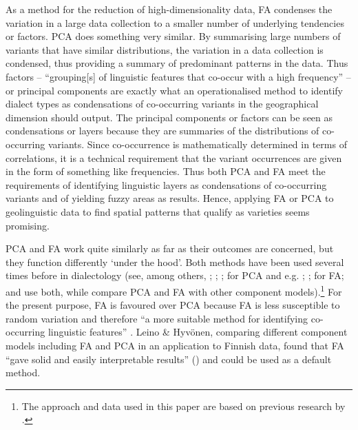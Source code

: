 \documentclass[output=paper]{LSP/langsci}
\begin{document}
As a method for the reduction of high-dimensionality data, FA condenses the variation in a large data collection to a smaller number of underlying tendencies or factors. PCA does something very similar. By summarising large numbers of variants that have similar distributions, the variation in a data collection is condensed, thus providing a summary of predominant patterns in the data. Thus factors – “grouping[s] of linguistic features that co-occur with a high frequency” – or principal components are exactly what an operationalised method to identify dialect types as condensations of co-occurring variants in the geographical dimension should output. The principal components or factors can be seen as condensations or layers because they are summaries of the distributions of co-occurring variants. Since co-occurrence is mathematically determined in terms of correlations, it is a technical requirement that the variant occurrences are given in the form of something like frequencies. Thus both PCA and FA meet the requirements of identifying linguistic layers as condensations of co-occurring variants and of yielding fuzzy areas as results. Hence, applying FA or PCA to geolinguistic data to find spatial patterns that qualify as varieties seems promising.

PCA and FA work quite similarly as far as their outcomes are concerned, but they function differently ‘under the hood’. Both methods have been used several times before in dialectology (see, among others, \citealt{shackleton_english-american_2005}; \citealt{hyvonen_multivariate_2007}; \citealt{szmrecsanyi_holistic_2011}; \citealt{wieling_analyzing_2013} for PCA and e.g. \citealt{clopper_north_2006}; \citealt{nerbonne_identifying_2006}; \citealt{grieve_statistical_2011} for FA; \citealt{grieve_corpus-based_2009} and \citealt{leinonen_acoustic_2010} use both, while \citealt{leino_comparison_2008} compare PCA and FA with other component models).\footnote{The approach and data used in this paper are based on previous research by \citet{pickl_probabilistische_2013, pickl_verdichtungen_2013,buhler_dialektraume_2014,elmentaler_latente_2015,proll_raumvariation_2015}.} For the present purpose, FA is favoured over PCA because FA is less susceptible to random variation and therefore “a more suitable method for identifying co-occurring linguistic features” \citep[106]{leinonen_acoustic_2010}. Leino \& Hyvönen, comparing different component models including FA and PCA in an application to Finnish data, found that FA “gave solid and easily interpretable results” (\citeyear[186]{leino_comparison_2008}) and could be used as a default method.
\end{document}
